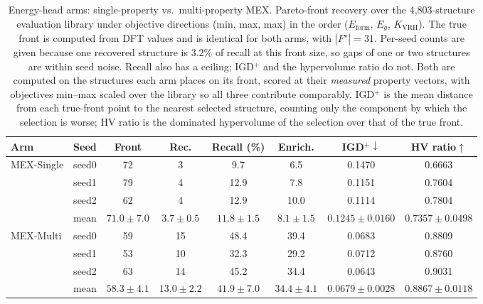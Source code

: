 \begin{table}[htbp]
\renewcommand{\arraystretch}{1.2}
\setlength{\tabcolsep}{4pt}
\caption{Energy-head arms: single-property vs.\ multi-property MEX. Pareto-front recovery over the 4{,}803-structure evaluation library under objective directions (min, max, max) in the order ($E_\mathrm{form}$, $E_g$, $K_\mathrm{VRH}$). The true front is computed from DFT values and is identical for both arms, with $|F^\star|{=}31$. Per-seed counts are given because one recovered structure is 3.2\% of recall at this front size, so gaps of one or two structures are within seed noise. Recall also has a ceiling; IGD$^+$ and the hypervolume ratio do not. Both are computed on the structures each arm places on its front, scored at their \emph{measured} property vectors, with objectives min--max scaled over the library so all three contribute comparably. IGD$^+$ is the mean distance from each true-front point to the nearest selected structure, counting only the component by which the selection is worse; HV ratio is the dominated hypervolume of the selection over that of the true front.}
\label{tab:pareto_arms_mex_heldout_min_max_max}
\centering
\footnotesize
\begin{tabular}{@{}llcccccc@{}}
\hline\hline
\textbf{Arm} & \textbf{Seed} & \textbf{Front} & \textbf{Rec.} & \textbf{Recall (\%)} & \textbf{Enrich.} & \textbf{IGD$^+\downarrow$} & \textbf{HV ratio$\uparrow$} \\
\hline
\multirow{4}{*}{MEX-Single}
  & seed0 & 72 & 3 & 9.7 & 6.5 & 0.1470 & 0.6663 \\
  & seed1 & 79 & 4 & 12.9 & 7.8 & 0.1151 & 0.7604 \\
  & seed2 & 62 & 4 & 12.9 & 10.0 & 0.1114 & 0.7804 \\
  & mean & $71.0 \pm 7.0$ & $3.7 \pm 0.5$ & $11.8 \pm 1.5$ & $8.1 \pm 1.5$ & $0.1245 \pm 0.0160$ & $0.7357 \pm 0.0498$ \\
\hline
\multirow{4}{*}{MEX-Multi}
  & seed0 & 59 & 15 & 48.4 & 39.4 & 0.0683 & 0.8809 \\
  & seed1 & 53 & 10 & 32.3 & 29.2 & 0.0712 & 0.8760 \\
  & seed2 & 63 & 14 & 45.2 & 34.4 & 0.0643 & 0.9031 \\
  & mean & $58.3 \pm 4.1$ & $13.0 \pm 2.2$ & $41.9 \pm 7.0$ & $34.4 \pm 4.1$ & $0.0679 \pm 0.0028$ & $0.8867 \pm 0.0118$ \\
\hline\hline
\end{tabular}
\end{table}
